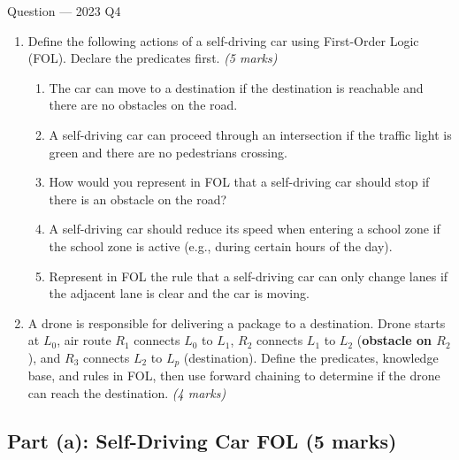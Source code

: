 \documentclass[12pt,a4paper]{article}
\begin{document}
\begin{qbox}{Question --- 2023 Q4}
\begin{enumerate}[label=(\alph*),noitemsep]
  \item Define the following actions of a self-driving car using First-Order Logic (FOL). Declare the predicates first. \hfill\textit{(5 marks)}
    \begin{enumerate}[label=(\roman*),noitemsep]
      \item The car can move to a destination if the destination is reachable and there are no obstacles on the road.
      \item A self-driving car can proceed through an intersection if the traffic light is green and there are no pedestrians crossing.
      \item How would you represent in FOL that a self-driving car should stop if there is an obstacle on the road?
      \item A self-driving car should reduce its speed when entering a school zone if the school zone is active (e.g., during certain hours of the day).
      \item Represent in FOL the rule that a self-driving car can only change lanes if the adjacent lane is clear and the car is moving.
    \end{enumerate}
  \item A drone is responsible for delivering a package to a destination. Drone starts at $L_0$, air route $R_1$ connects $L_0$ to $L_1$, $R_2$ connects $L_1$ to $L_2$ (\textbf{obstacle on $R_2$}), and $R_3$ connects $L_2$ to $L_p$ (destination). Define the predicates, knowledge base, and rules in FOL, then use forward chaining to determine if the drone can reach the destination. \hfill\textit{(4 marks)}
\end{enumerate}
\end{qbox}

\subsection{Part (a): Self-Driving Car FOL (5 marks)}
\end{document}
